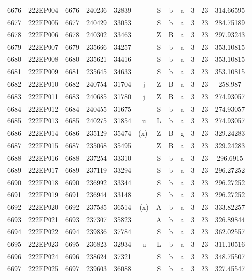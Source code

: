 \begin{tabular}{|*{12}{c|}}
6676 & 222EP004 & 6676 & 240236 & 32839 &  & S & b & a & 3 & 23 & 314.66595 \\ 
6677 & 222EP005 & 6677 & 240429 & 33053 &  & S & b & a & 3 & 23 & 284.75189 \\ 
6678 & 222EP006 & 6678 & 240302 & 33463 &  & Z & B & a & 3 & 23 & 297.93243 \\ 
6679 & 222EP007 & 6679 & 235666 & 34257 &  & S & b & a & 3 & 23 & 353.10815 \\ 
6680 & 222EP008 & 6680 & 235621 & 34416 &  & S & b & a & 3 & 23 & 353.10815 \\ 
6681 & 222EP009 & 6681 & 235645 & 34633 &  & S & b & a & 3 & 23 & 353.10815 \\ 
6682 & 222EP010 & 6682 & 240754 & 31704 & j & Z & B & a & 3 & 23 & 258.987 \\ 
6683 & 222EP011 & 6683 & 240685 & 31780 & j & Z & B & a & 3 & 23 & 274.93057 \\ 
6684 & 222EP012 & 6684 & 240455 & 31675 &  & S & b & a & 3 & 23 & 274.93057 \\ 
6685 & 222EP013 & 6685 & 240275 & 31854 & u & L & b & a & 3 & 23 & 274.93057 \\ 
6686 & 222EP014 & 6686 & 235129 & 35474 & (x)- & Z & B & g & 3 & 23 & 329.24283 \\ 
6687 & 222EP015 & 6687 & 235068 & 35495 &  & Z & B & a & 3 & 23 & 329.24283 \\ 
6688 & 222EP016 & 6688 & 237254 & 33310 &  & S & b & a & 3 & 23 & 296.6915 \\ 
6689 & 222EP017 & 6689 & 237119 & 33294 &  & S & b & a & 3 & 23 & 296.27252 \\ 
6690 & 222EP018 & 6690 & 236992 & 33344 &  & S & b & a & 3 & 23 & 296.27252 \\ 
6691 & 222EP019 & 6691 & 236944 & 33148 &  & S & b & a & 3 & 23 & 296.27252 \\ 
6692 & 222EP020 & 6692 & 237585 & 36514 & (x) & A & b & a & 3 & 23 & 333.82257 \\ 
6693 & 222EP021 & 6693 & 237307 & 35823 &  & A & b & a & 3 & 23 & 326.89844 \\ 
6694 & 222EP022 & 6694 & 239836 & 37784 &  & S & b & a & 3 & 23 & 362.02557 \\ 
6695 & 222EP023 & 6695 & 236823 & 32934 & u & L & b & a & 3 & 23 & 311.10516 \\ 
6696 & 222EP024 & 6696 & 238624 & 37321 &  & S & b & a & 3 & 23 & 348.75507 \\ 
6697 & 222EP025 & 6697 & 239603 & 36088 &  & S & b & a & 3 & 23 & 327.45547 \\ 

\end{tabular}
